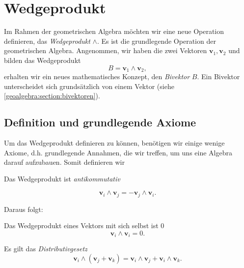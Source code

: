 
\section{Wedgeprodukt
\label{geoalgebra:section:wedgeprodukt}}

Im Rahmen der geometrischen Algebra möchten wir eine neue Operation
definieren, das \emph{Wedgeprodukt} $\wedge$.
Es ist die grundlegende Operation der geometrischen
Algebra.
Angenommen, wir haben die
zwei Vektoren $\mathbf{v}_1, \mathbf{v}_2$ und bilden das Wedgeprodukt
\begin{equation}
  B = \mathbf{v}_1 \wedge \mathbf{v}_2,
\end{equation}
erhalten wir ein neues mathematisches Konzept, den \emph{Bivektor} $B$.
Ein Bivektor unterscheidet sich grundsätzlich von einem Vektor (siehe \autoref{geoalgebra:section:bivektoren}).

\subsection{Definition und grundlegende Axiome}
\label{geoalgebra:section:axiome}
Um das Wedgeprodukt definieren zu können, benötigen wir einige wenige Axiome, d.h. grundlegende Annahmen, die wir treffen,
um uns eine Algebra darauf aufzubauen. Somit definieren wir

\begin{axiom}
  Das Wedgeprodukt ist \em{antikommutativ}

  \begin{equation*}
  \mathbf{v}_i \wedge \mathbf{v}_j = -\mathbf{v}_j \wedge \mathbf{v}_i.
  \end{equation*}
  \label{geoalgebra:axiom:antikommutativ}
\end{axiom}
Daraus folgt:
\begin{lemma}
  Das Wedgeprodukt eines Vektors mit sich selbst ist $0$
  \begin{equation*}
  \mathbf{v}_i \wedge \mathbf{v}_i = 0.
  \end{equation*}
\end{lemma}

\begin{axiom}
  Es gilt das \em{Distributivgesetz}
  \begin{equation*}
  \mathbf{v}_i \wedge (\mathbf{v}_j + \mathbf{v}_k) = \mathbf{v}_i \wedge \mathbf{v}_j + \mathbf{v}_i \wedge \mathbf{v}_k.
  \end{equation*}
\end{axiom}

